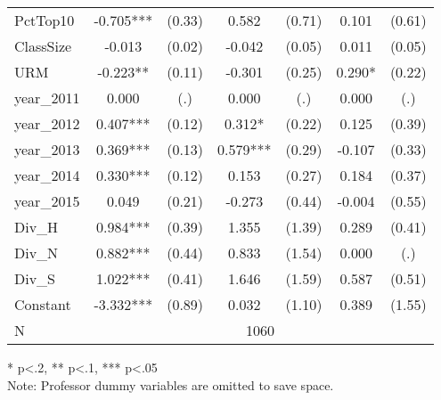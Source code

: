\begin{sidewaystable}[htb]
\begin{threeparttable}
\begin{tabular}{l|c|c|c|c|c|c}
      PctTop10          & -0.705***                    & (0.33)                       & 0.582                & (0.71)               & 0.101                & (0.61)               \\
      ClassSize         & -0.013                       & (0.02)                       & -0.042               & (0.05)               & 0.011                & (0.05)               \\
      URM               & -0.223**                     & (0.11)                       & -0.301               & (0.25)               & 0.290*               & (0.22)               \\
      year\_2011        & 0.000                        & (.)                          & 0.000                & (.)                  & 0.000                & (.)                  \\
      year\_2012        & 0.407***                     & (0.12)                       & 0.312*               & (0.22)               & 0.125                & (0.39)               \\
      year\_2013        & 0.369***                     & (0.13)                       & 0.579***             & (0.29)               & -0.107               & (0.33)               \\
      year\_2014        & 0.330***                     & (0.12)                       & 0.153                & (0.27)               & 0.184                & (0.37)               \\
      year\_2015        & 0.049                        & (0.21)                       & -0.273               & (0.44)               & -0.004               & (0.55)               \\
      Div\_H            & 0.984***                     & (0.39)                       & 1.355                & (1.39)               & 0.289                & (0.41)               \\
      Div\_N            & 0.882***                     & (0.44)                       & 0.833                & (1.54)               & 0.000                & (.)                  \\
      Div\_S            & 1.022***                     & (0.41)                       & 1.646                & (1.59)               & 0.587                & (0.51)               \\
      Constant          & -3.332***                    & (0.89)                       & 0.032                & (1.10)               & 0.389                & (1.55)               \\
      \hline
      N & \multicolumn{6}{|c}{1060} \\
      \hline
      \hline
    \end{tabular}
    \begin{tablenotes}
    \item{* p<.2, ** p<.1, *** p<.05 \\ Note: Professor dummy variables are omitted to save space.}
    \end{tablenotes}
  \end{threeparttable}
\end{sidewaystable}

